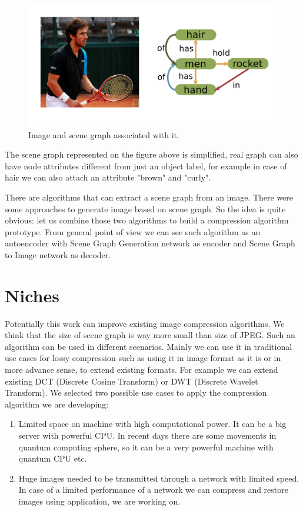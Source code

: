 \begin{figure}[!h]
    \centering
    \includegraphics[width=\textwidth]{figure/image-and-scene-graph.png}
    \caption{Image and scene graph associated with it.}
    \label{image_and_scene_graph}
\end{figure}

The scene graph represented on the figure above is simplified, real graph can also have node attributes different from just an object label, for example in case of hair we can also attach an attribute "brown" and "curly".

There are algorithms that can extract a scene graph from an image. There were some approaches to generate image based on scene graph. So the idea is quite obvious: let us combine those two algorithms to build a compression algorithm prototype. From general point of view we can see such algorithm as an autoencoder with Scene Graph Generation network as encoder and Scene Graph to Image network as decoder.

\chapter{Niches}

Potentially this work can improve existing image compression algorithms. We think that the size of scene graph is way more small than size of JPEG. Such an algorithm can be used in different scenarios. Mainly we can use it in traditional use cases for lossy compression such as using it in image format as it is or in more advance sense, to extend existing formats. For example we can extend existing DCT (Discrete Cosine Transform) or DWT (Discrete Wavelet Transform). We selected two possible use cases to apply the compression algorithm we are developing:

\begin{enumerate}
    \item Limited space on machine with high computational power. It can be a big server with powerful CPU. In recent days there are some movements in quantum computing sphere, so it can be a very powerful machine with quantum CPU etc.
    \item Huge images needed to be transmitted through a network with limited speed. In case of a limited performance of a network we can compress and restore images using application, we are working on.
\end{enumerate}


